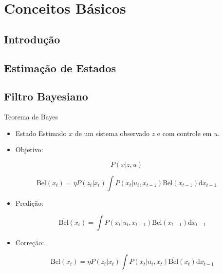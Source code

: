 \chapter{Conceitos Básicos}

 
\section{Introdução}\label{intro}

\section{Estimação de Estados}
\section{Filtro Bayesiano}





Teorema de Bayes
   
  \begin{itemize}
    \item Estado Estimado $x$ de um sistema observado $z$ e com controle em $u$.
    \item Objetivo:
  \end{itemize}

  \begin{equation}
    P(x|z,u)
  \end{equation}

 

\begin{equation*}
    \text{Bel}(x_t) = \eta P(z_t| x_t) \int P(x_t| u_t, x_{t-1}) \text{Bel}(x_{t-1})\text{d}x_{t-1}
\end{equation*}


    \begin{itemize}
        \item Predição:
        
        \begin{equation*}
            \overline{\text{Bel}}(x_t) = \int P(x_t| u_t, x_{t-1}) \text{Bel}(x_{t-1})\text{d}x_{t-1}
        \end{equation*}

        \item Correção:

        \begin{equation*}
            \text{Bel}(x_t) = \eta P(z_t| x_t) \int P(x_t| u_t, x_{t}) \overline{\text{Bel}}(x_{t})\text{d}x_{t-1}
        \end{equation*}
    \end{itemize}


